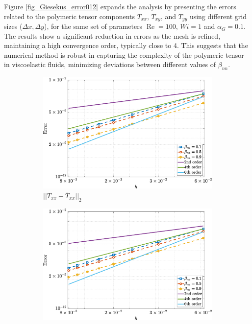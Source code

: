 \documentclass[preprint, 12pt]{elsarticle}
\begin{document}
Figure \ref{fig_Giesekus_error012} expands the analysis by presenting the errors related to the polymeric tensor components $T_{xx}$, $T_{xy}$, and $T_{yy}$ using different grid sizes ($\Delta x, \Delta y$), for the same set of parameters $\operatorname{Re} = 100$, $Wi = 1$ and $\alpha_G = 0.1$. The results show a significant reduction in errors as the mesh is refined, maintaining a high convergence order, typically close to 4. This suggests that the numerical method is robust in capturing the complexity of the polymeric tensor in viscoelastic fluids, minimizing deviations between different values of $\beta_{nn}$.
\begin{figure}[H]
    \centering  
    \begin{subfigure}[b]{.46\textwidth}
        \includegraphics[width=\textwidth]{NormErr_2nd_Re_100_Wi_1_epsilon_0_xi_0_alphaG_0.1_Dt_1e-06_at_0.05_tipsim_1_MMS_12_Txx.eps}
        \caption{$||T_{xx} - \overline{T}_{xx}||_{2}$}
        \label{error_txx_2nd_Case1_giesekus_alphaG_0.1}
    \end{subfigure}
    \vspace{0.2cm}
    \qquad
    \begin{subfigure}[b]{.46\textwidth}
        \includegraphics[width=\textwidth]{NormErr_2nd_Re_100_Wi_1_epsilon_0_xi_0_alphaG_0.1_Dt_1e-06_at_0.05_tipsim_1_MMS_12_Txy.eps}

\end{subfigure}
\end{figure}
\end{document}
